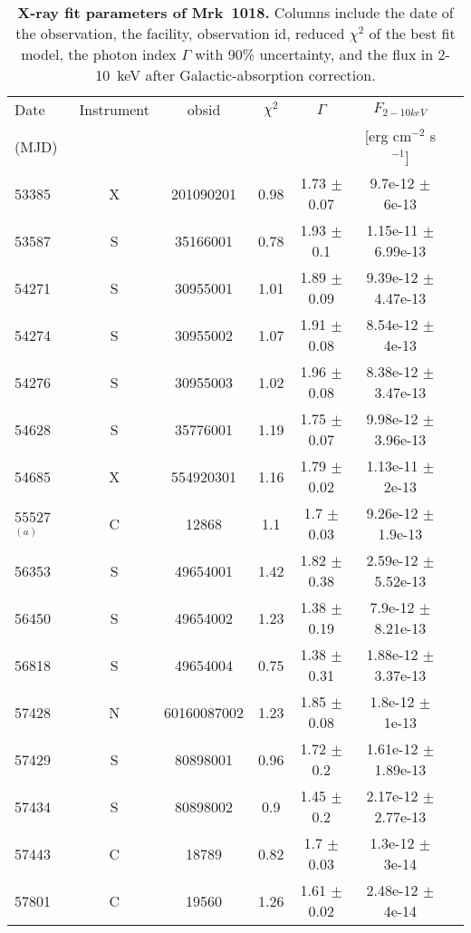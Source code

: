 \begin{table}
\centering
\caption{{ \bf X-ray fit parameters of Mrk~1018. } Columns include the date of the observation, the facility, observation id, reduced $\chi ^2$ of the best fit model, the photon index $\Gamma$ with 90\% uncertainty, and the flux in 2-10~keV after Galactic-absorption correction. }
\label{tab:table1}

\begin{tabular}{lcccccc}
\hline
\hline
 
  Date   &   Instrument & obsid  & $\chi ^2$  &$\Gamma$  &  $F_{2-10keV}$  & \\ 
  (MJD)  &              &        &          &                    &  [erg cm$^{-2}$ s$^{-1}$] &      
 \\  \hline
53385 & X & 201090201 & 0.98 & 1.73 $\pm$ 0.07 & 9.7e-12 $\pm$ 6e-13 \\ 
53587 & S & 35166001 & 0.78 & 1.93 $\pm$ 0.1 & 1.15e-11 $\pm$ 6.99e-13 \\ 
54271 & S & 30955001 & 1.01 & 1.89 $\pm$ 0.09 & 9.39e-12 $\pm$ 4.47e-13 \\ 
54274 & S & 30955002 & 1.07 & 1.91 $\pm$ 0.08 & 8.54e-12 $\pm$ 4e-13 \\ 
54276 & S & 30955003 & 1.02 & 1.96 $\pm$ 0.08 & 8.38e-12 $\pm$ 3.47e-13 \\ 
54628 & S & 35776001 & 1.19 & 1.75 $\pm$ 0.07 & 9.98e-12 $\pm$ 3.96e-13 \\ 
54685 & X & 554920301 & 1.16 & 1.79 $\pm$ 0.02 & 1.13e-11 $\pm$ 2e-13 \\ 
55527$^{(a)}$ & C & 12868 & 1.1 & 1.7 $\pm$ 0.03 & 9.26e-12 $\pm$ 1.9e-13 \\ 
56353 & S & 49654001 & 1.42 & 1.82 $\pm$ 0.38 & 2.59e-12 $\pm$ 5.52e-13 \\ 
56450 & S & 49654002 & 1.23 & 1.38 $\pm$ 0.19 & 7.9e-12 $\pm$ 8.21e-13 \\ 
56818 & S & 49654004 & 0.75 & 1.38 $\pm$ 0.31 & 1.88e-12 $\pm$ 3.37e-13 \\ 
57428 & N & 60160087002 & 1.23 & 1.85 $\pm$ 0.08 & 1.8e-12 $\pm$ 1e-13 \\ 
57429 & S & 80898001 & 0.96 & 1.72 $\pm$ 0.2 & 1.61e-12 $\pm$ 1.89e-13 \\ 
57434 & S & 80898002 & 0.9 & 1.45 $\pm$ 0.2 & 2.17e-12 $\pm$ 2.77e-13 \\ 
57443 & C & 18789 & 0.82 & 1.7 $\pm$ 0.03 & 1.3e-12 $\pm$ 3e-14 \\ 
57801 & C & 19560 & 1.26 & 1.61 $\pm$ 0.02 & 2.48e-12 $\pm$ 4e-14 \\ 

\end{tabular}
\end{table}
